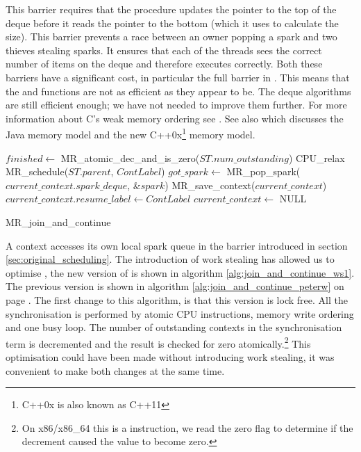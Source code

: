 This barrier requires that the procedure updates the pointer to the top of the
deque before it reads the pointer to the bottom (which it uses to
calculate the size).
This barrier prevents a race between an owner popping a spark and two
thieves stealing sparks.
It ensures that each of the threads sees the correct number of items on the
deque and therefore executes correctly.
Both these barriers have a significant cost,
in particular the full barrier in \pop.
This means that the \push and \pop functions are not as efficient as they
appear to be.
The deque algorithms are still efficient enough;
we have not needed to improve them further.
For more information about C's weak memory ordering see
\citet{Boehm:2005:threads-as-a-library}.
See also \citet{Adve:2010:memory-models} which discusses the Java memory
model and the new C++0x\footnote{C++0x is also known as C++11} memory model.

\begin{algorithm}
\begin{algorithmic}[1]
  \State $finished \gets$ MR\_atomic\_dec\_and\_is\_zero($ST.num\_outstanding$)
    \Else
        \State CPU\_relax
      \EndWhile
      \State MR\_schedule($ST.parent$, $ContLabel$)
    \EndIf
  \Else
    \State $got\_spark \gets$ MR\_pop\_spark($current\_context.spark\_deque$,
        \&$spark$)
    \Else
         \State MR\_save\_context($current\_context$)
         \State $current\_context.resume\_label \gets ContLabel$
         \State $current\_context \gets$ NULL
      \EndIf
    \EndIf
  \EndIf
\EndProcedure
\end{algorithmic}
\caption{MR\_join\_and\_continue}
\label{alg:join_and_continue_ws1}
\end{algorithm}

A context accesses its own local spark queue in the \joinandcontinue barrier
introduced in section \ref{sec:original_scheduling}.
The introduction of work stealing has allowed us to optimise
\joinandcontinue,
the new version of \joinandcontinue is shown in algorithm
\ref{alg:join_and_continue_ws1}.
The previous version is shown in
algorithm \ref{alg:join_and_continue_peterw}
on page \pageref{alg:join_and_continue_peterw}.
The first change to this algorithm,
is that this version is lock free.
All the synchronisation is performed by atomic CPU instructions, memory
write ordering and one busy loop.
The number of outstanding contexts in the synchronisation term is
decremented and the result is checked for zero atomically.\footnote{
    On x86/x86\_64 this is a  instruction, we read the
    zero flag to determine if the decrement caused the value to become
    zero.}
This optimisation could have been made without introducing work stealing,
it was convenient to make both changes at the same time.

